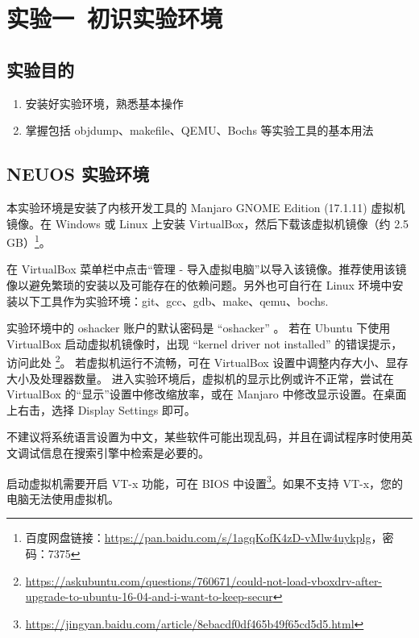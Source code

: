 \section{实验一\ 初识实验环境}

\subsection{实验目的}

\begin{enumerate}
	\item 安装好实验环境，熟悉基本操作
	\item 掌握包括 objdump、makefile、QEMU、Bochs 等实验工具的基本用法
\end{enumerate}

\subsection{NEUOS 实验环境}

本实验环境是安装了内核开发工具的 Manjaro GNOME Edition (17.1.11) 虚拟机镜像。在 Windows 或 Linux 上安装 VirtualBox，然后下载该虚拟机镜像（约 2.5 GB）\footnote{百度网盘链接：\url{https://pan.baidu.com/s/1agqKofK4zD-vMlw4uykplg}，密码：7375}。

在 VirtualBox 菜单栏中点击“管理 - 导入虚拟电脑”以导入该镜像。推荐使用该镜像以避免繁琐的安装以及可能存在的依赖问题。另外也可自行在 Linux 环境中安装以下工具作为实验环境：git、gcc、gdb、make、qemu、bochs.

实验环境中的 oshacker 账户的默认密码是 “oshacker” 。
若在 Ubuntu 下使用 VirtualBox 启动虚拟机镜像时，出现 “kernel driver not installed” 的错误提示，访问此处 \footnote{\url{https://askubuntu.com/questions/760671/could-not-load-vboxdrv-after-upgrade-to-ubuntu-16-04-and-i-want-to-keep-secur}}。
若虚拟机运行不流畅，可在 VirtualBox 设置中调整内存大小、显存大小及处理器数量。
进入实验环境后，虚拟机的显示比例或许不正常，尝试在 VirtualBox 的“显示”设置中修改缩放率，或在 Manjaro 中修改显示设置。在桌面上右击，选择 Display Settings 即可。

不建议将系统语言设置为中文，某些软件可能出现乱码，并且在调试程序时使用英文调试信息在搜索引擎中检索是必要的。

启动虚拟机需要开启 VT-x 功能，可在 BIOS 中设置\footnote{\url{https://jingyan.baidu.com/article/8ebacdf0df465b49f65cd5d5.html}}。如果不支持 VT-x，您的电脑无法使用虚拟机。

